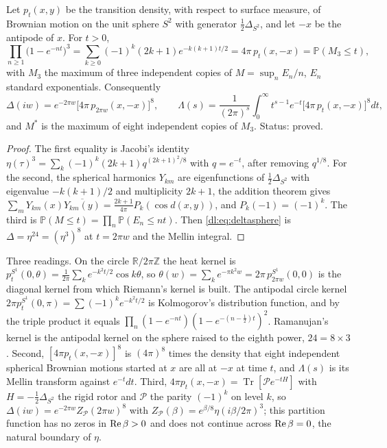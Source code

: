 \begin{theorem}\label{dl:thm:sphere}
Let $p_t(x,y)$ be the transition density, with respect to surface measure, of Brownian motion on the unit sphere $S^2$ with generator $\frac12\Delta_{S^2}$, and let $-x$ be the antipode of $x$. For $t>0$,
\begin{equation}\label{dl:eq:jacobi}
\prod_{n\ge1}\bigl(1-e^{-nt}\bigr)^3=\sum_{k\ge0}(-1)^k(2k+1)e^{-k(k+1)t/2}=4\pi\,p_t(x,-x)=\mathbb P(M_3\le t),
\end{equation}
with $M_3$ the maximum of three independent copies of $M=\sup_nE_n/n$, $E_n$ standard exponentials. Consequently
\begin{equation}\label{dl:eq:deltasphere}
\Delta(iw)=e^{-2\pi w}\bigl[4\pi\,p_{2\pi w}(x,-x)\bigr]^8,\qquad
\Lambda(s)=\frac1{(2\pi)^s}\int_0^\infty t^{s-1}e^{-t}\bigl[4\pi\,p_t(x,-x)\bigr]^8dt,
\end{equation}
and $M^*$ is the maximum of eight independent copies of $M_3$. Status: proved.
\end{theorem}

\begin{proof}
The first equality is Jacobi's identity $\eta(\tau)^3=\sum_k(-1)^k(2k+1)q^{(2k+1)^2/8}$ with $q=e^{-t}$, after removing $q^{1/8}$. For the second, the spherical harmonics $Y_{km}$ are eigenfunctions of $\frac12\Delta_{S^2}$ with eigenvalue $-k(k+1)/2$ and multiplicity $2k+1$, the addition theorem gives $\sum_mY_{km}(x)\overline{Y_{km}(y)}=\frac{2k+1}{4\pi}P_k(\cos d(x,y))$, and $P_k(-1)=(-1)^k$. The third is $\mathbb P(M\le t)=\prod_n\mathbb P(E_n\le nt)$. Then \eqref{dl:eq:deltasphere} is $\Delta=\eta^{24}=(\eta^3)^8$ at $t=2\pi w$ and the Mellin integral.
\end{proof}

Three readings. On the circle $\mathbb R/2\pi\mathbb Z$ the heat kernel is $p^{S^1}_t(0,\theta)=\frac1{2\pi}\sum_ke^{-k^2t/2}\cos k\theta$, so $\theta(w)=\sum_ke^{-\pi k^2w}=2\pi\,p^{S^1}_{2\pi w}(0,0)$ is the diagonal kernel from which Riemann's kernel is built. The antipodal circle kernel $2\pi p^{S^1}_t(0,\pi)=\sum(-1)^ke^{-k^2t/2}$ is Kolmogorov's distribution function, and by the triple product it equals $\prod_n(1-e^{-nt})(1-e^{-(n-\frac12)t})^2$. Ramanujan's kernel is the antipodal kernel on the sphere raised to the eighth power, $24=8\times3$. Second, $[4\pi p_t(x,-x)]^8$ is $(4\pi)^8$ times the density that eight independent spherical Brownian motions started at $x$ are all at $-x$ at time $t$, and $\Lambda(s)$ is its Mellin transform against $e^{-t}dt$. Third, $4\pi p_t(x,-x)=\operatorname{Tr}[\mathcal Pe^{-tH}]$ with $H=-\frac12\Delta_{S^2}$ the rigid rotor and $\mathcal P$ the parity $(-1)^k$ on level $k$, so $\Delta(iw)=e^{-2\pi w}Z_{\mathcal P}(2\pi w)^8$ with $Z_{\mathcal P}(\beta)=e^{\beta/8}\eta(i\beta/2\pi)^3$; this partition function has no zeros in $\operatorname{Re}\beta>0$ and does not continue across $\operatorname{Re}\beta=0$, the natural boundary of $\eta$.

